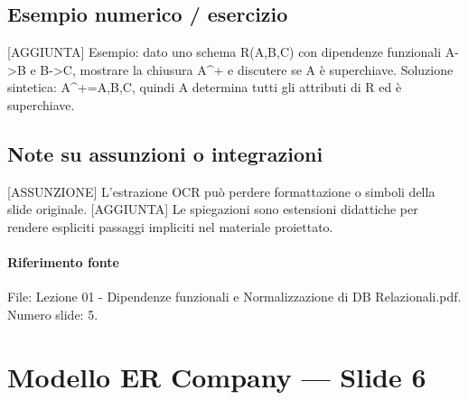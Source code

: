 \documentclass[11pt]{article}
\begin{document}
\subsection*{Esempio numerico / esercizio}
[AGGIUNTA] Esempio: dato uno schema R(A,B,C) con dipendenze funzionali A->B e B->C, mostrare la chiusura A^+ e discutere se A è superchiave. Soluzione sintetica: A^+={A,B,C}, quindi A determina tutti gli attributi di R ed è superchiave.
\subsection*{Note su assunzioni o integrazioni}
[ASSUNZIONE] L'estrazione OCR può perdere formattazione o simboli della slide originale.
[AGGIUNTA] Le spiegazioni sono estensioni didattiche per rendere espliciti passaggi impliciti nel materiale proiettato.
\paragraph{Riferimento fonte} File: Lezione 01 - Dipendenze funzionali e Normalizzazione di DB Relazionali.pdf. Numero slide: 5.
\section{Modello ER Company --- Slide 6}
\end{document}

